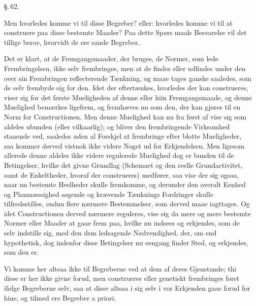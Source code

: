 \documentclass[12pt]{book}
\makeatletter
\def\textit#1{#1}%
\def\emph#1{#1}%
\newcommand{\umph}[2][misc]{%
  \@ifundefined{umph@#1@on}{#2}{\emph{#2}}}
\newcommand{\parag}[1]{%
  \par\vspace{0.9\baselineskip}%
  {\centering\textit{\S.\,#1.}\par}%
  \vspace{0.35\baselineskip}%
  \noindent\hspace{\parindent}\ignorespaces
}
\newcommand{\opage}[1]{\marginnote{\footnotesize\textit{[#1]}}}
\makeatother
\begin{document}
\parag{62}

Men hvorledes komme vi til disse Begreber? eller: hvorledes komme vi til at construere
paa disse bestemte Maader? Paa dette Spørs%
\opage{161}maals Besvarelse vil det tillige beroe, hvorvidt de ere sande Begreber.

Det er klart, at de Fremgangsmaader, der bruges, de Normer, som lede Frembringelsen,
ikke selv frembringes, men at de findes eller udfindes under den over sin Frembringen
reflecterende Tænkning, og maae tages ganske saaledes, som de selv frembyde sig for
den. Idet der eftertænkes, hvorledes der kan construeres, viser sig for det første
Mueligheden af denne eller hiin Fremgangsmaade, og denne Muelighed bemærkes ligefrem,
og fremhæves nu som den, der kan gjøres til en Norm for Constructionen. Men denne
Muelighed kan nu fra først af vise sig som aldeles ubunden (eller vilkaarlig); og
bliver den frembringende Virksomhed staaende ved, saaledes uden al Forskjel at
frembringe efter blotte Mueligheder, saa kommer derved vistnok ikke videre Noget ud for
Erkjendelsen. Men ligesom allerede denne aldeles ikke videre regulerede Muelighed dog
er bunden til de Betingelser, hvilke det givne Grundlag (Schemaet og den reelle
Grundactivitet, samt de Enkeltheder, hvoraf der construeres) medfører, saa vise der sig
ogsaa, naar nu bestemte Heelheder skulle fremkomme, og derunder den overalt Eenhed og
Planmæssighed søgende og krævende Tænknings Fordringer skulle tilfredsstilles, endnu
flere nærmere Bestemmelser, som derved maae iagttages. Og idet Constructionen derved
nærmere reguleres, vise sig da mere og mere bestemte Normer
\opage{162} eller Maader at gaae frem paa, hvilke nu indsees og erkjendes, som de selv indstille
sig, med den dem ledsagende \emph{Nødvendighed}, der, om end hypothetisk, dog indenfor
disse Betingelser nu eengang finder Sted, og erkjendes, som den er.

Vi komme her altsaa ikke til Begreberne ved at \umph[schwab]{abstrahere} dem af deres
Gjenstande; thi disse er her ikke givne forud, men construeres eller genetiskt
frembringes først ifølge Begreberne selv, saa at disse altsaa i sig selv i vor
Erkjenden gaae forud for hine, og tilmed ere Begreber \textit{a priori}.
\end{document}
